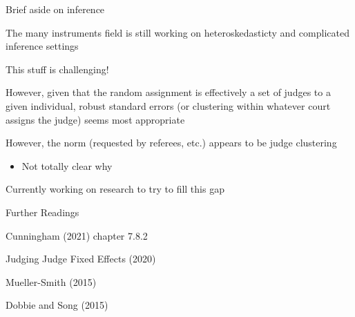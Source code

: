 \documentclass[notes,11pt, aspectratio=169]{beamer}
\newenvironment{wideitemize}{\itemize\addtolength{\itemsep}{10pt}}{\enditemize}
\begin{document}
\begin{frame}{Brief aside on inference}
  \begin{wideitemize}
  \item The many instruments field is still working on heteroskedasticty and complicated inference settings
  \item This stuff is challenging!
  \item However, given that the random assignment is effectively a set
    of judges to a given individual, robust standard errors (or
    clustering within whatever court assigns the judge) seems most appropriate
  \item However, the norm (requested by referees, etc.) appears to be judge clustering 
    \begin{itemize}
    \item   Not totally clear why
    \end{itemize}
  \item Currently working on research to try to fill this gap
  \end{wideitemize}
\end{frame}

\begin{frame}{Further Readings}
  \begin{wideitemize}
  \item Cunningham (2021) chapter 7.8.2
  \item Judging Judge Fixed Effects (2020)
  \item Mueller-Smith (2015)
  \item Dobbie and Song (2015)
  \end{wideitemize}
\end{frame}
\end{document}
